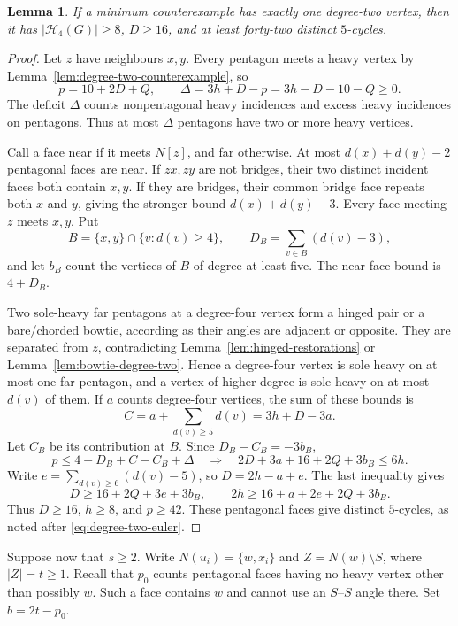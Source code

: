 \documentclass[11pt]{article}
\newtheorem{lemma}[theorem]{Lemma}
\theoremstyle{remark}
\numberwithin{equation}{section}
\numberwithin{table}{section}
\begin{document}
\begin{lemma}\label{lem:unique-degree-two-heavy-bound}
If a minimum counterexample has exactly one degree-two vertex, then it
has $|\mathcal H_4(G)|\ge8$, $D\ge16$, and at least forty-two
distinct $5$-cycles.
\end{lemma}
\begin{proof}
Let $z$ have neighbours $x,y$. Every pentagon meets a heavy vertex by
Lemma~\ref{lem:degree-two-counterexample}, so
\[
 p=10+2D+Q,\qquad \Delta=3h+D-p=3h-D-10-Q\ge0.
\]
The deficit $\Delta$ counts nonpentagonal heavy incidences and excess
heavy incidences on pentagons. Thus at most $\Delta$ pentagons have
two or more heavy vertices.

Call a face near if it meets $N[z]$, and far otherwise. At most
$d(x)+d(y)-2$ pentagonal faces are near. If $zx,zy$ are not bridges,
their two distinct incident faces both contain $x,y$. If they are
bridges, their common bridge face repeats both $x$ and $y$, giving
the stronger bound $d(x)+d(y)-3$. Every face meeting $z$ meets $x,y$.
Put
\[
 B=\{x,y\}\cap\{v:d(v)\ge4\},\qquad
 D_B=\sum_{v\in B}(d(v)-3),
\]
and let $b_B$ count the vertices of $B$ of degree at least five.
The near-face bound is $4+D_B$.

Two sole-heavy far pentagons at a degree-four vertex form a hinged
pair or a bare/chorded bowtie, according as their angles are adjacent
or opposite. They are separated from $z$, contradicting
Lemma~\ref{lem:hinged-restorations} or
Lemma~\ref{lem:bowtie-degree-two}. Hence a degree-four vertex is sole heavy on at most one far pentagon,
and a vertex of higher degree is sole heavy on at most $d(v)$ of them.
If $a$ counts degree-four vertices, the sum of these bounds is
\[
 C=a+\sum_{d(v)\ge5}d(v)=3h+D-3a.
\]
Let $C_B$ be its contribution at $B$. Since $D_B-C_B=-3b_B$,
\[
 p\le4+D_B+C-C_B+\Delta
 \quad\Longrightarrow\quad
 2D+3a+16+2Q+3b_B\le6h.
\]
Write $e=\sum_{d(v)\ge6}(d(v)-5)$, so $D=2h-a+e$. The last
inequality gives
\[
 D\ge16+2Q+3e+3b_B,\qquad
 2h\ge16+a+2e+2Q+3b_B.
\]
Thus $D\ge16$, $h\ge8$, and $p\ge42$. These pentagonal faces give
distinct $5$-cycles, as noted after \eqref{eq:degree-two-euler}.
\end{proof}

Suppose now that $s\ge2$. Write $N(u_i)=\{w,x_i\}$ and
$Z=N(w)\setminus S$, where $|Z|=t\ge1$. Recall that $p_0$ counts
pentagonal faces having no heavy vertex other than possibly $w$.
Such a face contains $w$ and cannot use an $S$--$S$ angle there.
Set $b=2t-p_0$.
\end{document}
